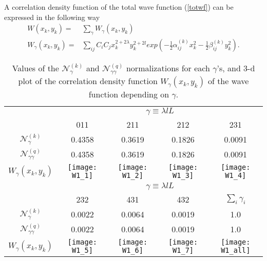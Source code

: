 \documentclass[
12pt, %
oneside, %
english, %
onehalfspacing, %
headsepline, %
]{MastersDoctoralThesis} %
\begin{document}
A correlation density function of the total wave function (\ref{totwf})  can be expressed in the following way
\begin{align}
W\left( x_k,y_k \right) =& \sum_{\gamma} W_{\gamma}\left( x_k,y_k \right) \nonumber \\
W_{\gamma}\left( x_k,y_k \right) =& \sum_{ij} C_i C_j x^{2+2\lambda}_k y^{2+2l}_k exp\left( - \tfrac{1}{2} \alpha^{(k)}_{ij} x_k^2 -  \tfrac{1}{2} \beta^{(k)}_{ij} y_k^2 \right) .
\end{align}
 

\begin{table}[]
\footnotesize
\begin{tabular}{@{}ccccc@{}}
\toprule
                                    & \multicolumn{4}{c}{$\gamma \equiv \lambda l L$} \\
                                    & 011     & 211     & 212     & 231               \\ \midrule
$\mathcal{N}_{\gamma}^{(k)}$        & 0.4358  & 0.3619  & 0.1826  & 0.0091            \\
$\mathcal{N}_{\gamma \gamma}^{(q)}$ & 0.4358  & 0.3619  & 0.1826  & 0.0091            \\
$W_{\gamma}\left(x_k,y_k\right)$    
&\texttt{[image: W1\_1]}         
&\texttt{[image: W1\_2]}         
&\texttt{[image: W1\_3]}         
&\texttt{[image: W1\_4]}                   
\\ \midrule
                                    & \multicolumn{4}{c}{$\gamma \equiv \lambda l L$} \\ 
                                    & 232     & 431     & 432     & $\sum_i \gamma_i$ \\ \midrule
$\mathcal{N}_{\gamma}^{(k)}$        & 0.0022  & 0.0064  & 0.0019  & 1.0               \\
$\mathcal{N}_{\gamma \gamma}^{(q)}$ & 0.0022  & 0.0064  & 0.0019  & 1.0               \\
$W_{\gamma}\left(x_k,y_k\right)$    
&\texttt{[image: W1\_5]}         
&\texttt{[image: W1\_6]}         
&\texttt{[image: W1\_7]}         
&\texttt{[image: W1\_all]}                  
\\ \bottomrule
\end{tabular}
\caption{Values of the $\mathcal{N}_{\gamma}^{(k)}$ and  $\mathcal{N}_{\gamma \gamma}^{(q)}$ normalizations for each $\gamma$'s, and 3-d plot of the correlation density function $W_{\gamma}\left(x_k,y_k\right)$ of the wave function depending on $\gamma$.}
\label{table:atable}
\end{table}
\end{document}
